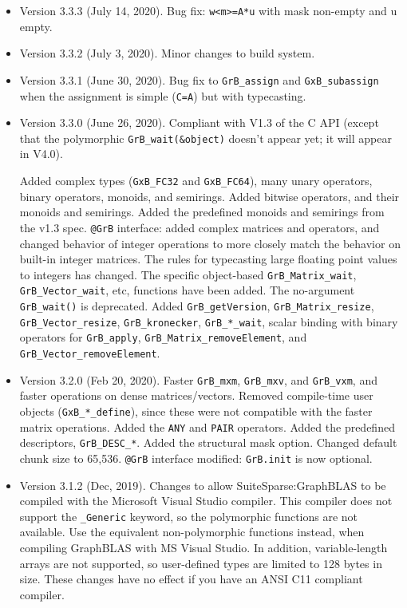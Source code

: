 \documentclass[12pt]{article}
\begin{document}
\begin{itemize}
\item Version 3.3.3 (July 14, 2020).
    Bug fix: \verb'w<m>=A*u' with mask non-empty and u empty.

\item Version 3.3.2 (July 3, 2020).  Minor changes to build system.

\item Version 3.3.1 (June 30, 2020).  Bug fix to \verb'GrB_assign' and
    \verb'GxB_subassign' when the assignment is simple (\verb'C=A') but
    with typecasting.

\item Version 3.3.0 (June 26, 2020).  Compliant with V1.3 of the C API
    (except that the polymorphic \verb'GrB_wait(&object)' doesn't appear yet;
    it will appear in V4.0).

    Added complex types (\verb'GxB_FC32' and \verb'GxB_FC64'), many unary
    operators, binary operators, monoids, and semirings.  Added bitwise
    operators, and their monoids and semirings.  Added the predefined monoids
    and semirings from the v1.3 spec.  \verb'@GrB' interface: added complex
    matrices and operators, and changed behavior of integer operations to more
    closely match the behavior on built-in integer matrices.  The rules for
    typecasting large floating point values to integers has changed.  The
    specific object-based \verb'GrB_Matrix_wait', \verb'GrB_Vector_wait', etc,
    functions have been added.  The no-argument \verb'GrB_wait()' is
    deprecated.  Added \verb'GrB_getVersion', \verb'GrB_Matrix_resize',
    \verb'GrB_Vector_resize', \verb'GrB_kronecker', \verb'GrB_*_wait', scalar
    binding with binary operators for \verb'GrB_apply', \newline
    \verb'GrB_Matrix_removeElement', and \verb'GrB_Vector_removeElement'.

\item Version 3.2.0 (Feb 20, 2020).  Faster \verb'GrB_mxm', \verb'GrB_mxv', and
    \verb'GrB_vxm', and faster operations on dense matrices/vectors.  Removed
    compile-time user objects (\verb'GxB_*_define'), since these were not
    compatible with the faster matrix operations.  Added the \verb'ANY' and
    \verb'PAIR' operators.  Added the predefined descriptors,
    \verb'GrB_DESC_*'.  Added the structural mask option.  Changed default
    chunk size to 65,536.  \verb'@GrB' interface modified:  \verb'GrB.init' is
    now optional.

\item Version 3.1.2 (Dec, 2019).  Changes to allow SuiteSparse:GraphBLAS
    to be compiled with the Microsoft Visual Studio compiler.  This compiler
    does not support the \verb'_Generic' keyword, so the polymorphic functions
    are not available.  Use the equivalent non-polymorphic functions instead,
    when compiling GraphBLAS with MS Visual Studio.  In addition,
    variable-length arrays are not supported, so user-defined types are limited
    to 128 bytes in size.  These changes have no effect if you have an ANSI C11
    compliant compiler.


\end{itemize}
\end{document}
